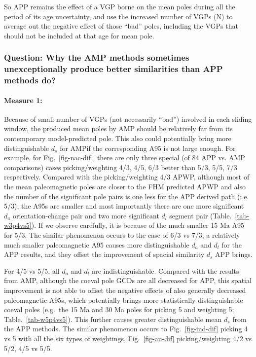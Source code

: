 So APP remains the effect of a VGP borne on the mean poles during all the period
of its age uncertainty, and use the increased number of VGPs (N) to average out
the negative effect of those ``bad'' poles, including the VGPs that should not
be included at that age for mean pole.

\subsubsection{Question: Why the AMP methods sometimes unexceptionally produce
better similarities than APP methods do?}

\paragraph{Measure 1:}

Because of small number of VGPs (not necessarily ``bad'') involved in each
sliding window, the produced mean poles by AMP should be relatively far from
its contemporary model-predicted pole. This also could potentially bring more
distinguishable $d_s$ for AMP\@ if the corresponding A95 is not large enough.
For example, for Fig.~\ref{fig-nac-dif}, there are only three special (of 84 APP
vs. AMP comparisons) cases picking/weighting 4/3, 4/5, 6/3 better than 5/3, 5/5,
7/3 respectively. Compared with the picking/weighting 4/3 APWP, although most of
the mean paleomagnetic poles are closer to the FHM predicted APWP and also the
number of the significant pole pairs is one less for the APP derived path (i.e.
5/3), the A95s are smaller and most importantly there are one more significant
$d_a$ orientation-change pair and two more significant $d_l$ segment pair
(Table.~\ref{tab-w3p4vs5}). If we observe carefully, it is because of the much
smaller 15 Ma A95 for 5/3. The similar phenomenon occurs to the case of 6/3 vs
7/3, a relatively much smaller paleomagnetic A95 causes more distinguishable
$d_a$ and $d_l$ for the APP results, and they offset the improvement of spacial
similarity $d_s$ APP brings.

For 4/5 vs 5/5, all $d_a$ and $d_l$ are indistinguishable. Compared with the
results from AMP, although the coeval pole GCDs are all decreased for APP, this
spatial improvement is not able to offset the negative effects of also
generally decreased paleomagnetic A95s, which potentially brings more
statistically distinguishable coeval poles (e.g.\ the 15 Ma and 30 Ma poles for
picking 5 and weighting 5; Table.~\ref{tab-w5p4vs5}). This further causes
greater distinguishable mean $d_s$ from the APP methods. The similar phenomenon
occurs to Fig.~\ref{fig-ind-dif} picking 4 vs 5 with all the six types of
weightings, Fig.~\ref{fig-au-dif} picking/weighting 4/2 vs
5/2, 4/5 vs 5/5.


